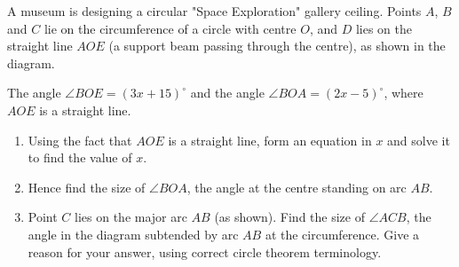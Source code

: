 \begin{question}
\noindent A museum is designing a circular "Space Exploration" gallery ceiling. Points $A$, $B$ and $C$ lie on the circumference of a circle with centre $O$, and $D$ lies on the straight line $AOE$ (a support beam passing through the centre), as shown in the diagram.

\noindent The angle $\angle BOE = (3x + 15)^\circ$ and the angle $\angle BOA = (2x - 5)^\circ$, where $AOE$ is a straight line.

\begin{center}
\end{center}

\begin{enumerate}
    \item[(a)] Using the fact that $AOE$ is a straight line, form an equation in $x$ and solve it to find the value of $x$.
    \vspace{3.5cm}

    \item[(b)] Hence find the size of $\angle BOA$, the angle at the centre standing on arc $AB$.
    \vspace{2cm}

    \item[(c)] Point $C$ lies on the major arc $AB$ (as shown). Find the size of $\angle ACB$, the angle in the diagram subtended by arc $AB$ at the circumference. Give a reason for your answer, using correct circle theorem terminology.
    \vspace{3.5cm}
\end{enumerate}
\end{question}
